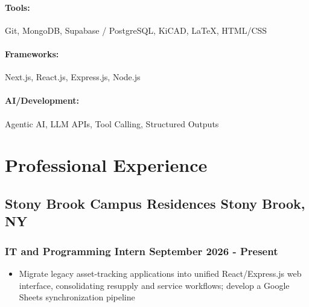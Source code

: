 \documentclass[10pt]{article}
\begin{document}
\paragraph{Tools:} Git, MongoDB, Supabase / PostgreSQL, KiCAD, LaTeX, HTML/CSS\\
\vspace{-2.1\baselineskip}
\paragraph{Frameworks:} Next.js, React.js, Express.js, Node.js\\
\vspace{-2.1\baselineskip}
\paragraph{AI/Development:} Agentic AI, LLM APIs, Tool Calling, Structured Outputs\\
\vspace{-1\baselineskip}


\section{Professional Experience}
\subsection{Stony Brook Campus Residences \hfill Stony Brook, NY}
\subsubsection{IT and Programming Intern \hfill September 2026 - Present}
\begin{itemize}
    \item Migrate legacy asset-tracking applications into unified React/Express.js web interface, consolidating resupply and service workflows; develop a Google Sheets synchronization pipeline 
\end{itemize}
\end{document}
